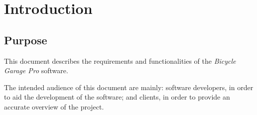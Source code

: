 \documentclass[12pt,titlepage,bibliography=totoc]{article}
\begin{document}


\maketitle
\newpage
\tableofcontents
\thispagestyle{empty}
\setcounter{page}{0}
\newpage

\section{Introduction}
\subsection{Purpose}
This document describes the requirements and functionalities of the \emph{Bicycle Garage Pro} software.

The intended audience of this document are mainly: software developers, in order to aid the development of the software; and clients, in order to provide an accurate overview of the project.
\end{document}
